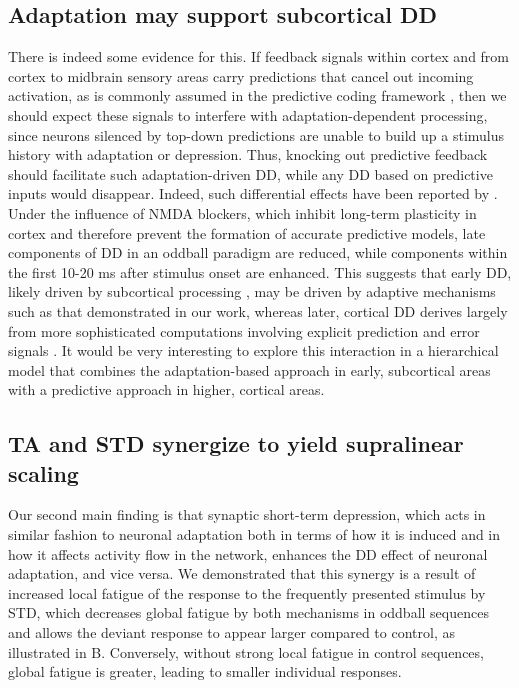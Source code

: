 \documentclass[9pt,lineno,onehalfspacing]{elife}
\begin{document}
\subsection{Adaptation may support subcortical DD}

There is indeed some evidence for this. If feedback signals within cortex and from cortex to midbrain sensory areas carry predictions that cancel out incoming activation, as is commonly assumed in the predictive coding framework \citep{Rao1999-xc, Friston2005-jz, Carbajal2018-sd}, then we should expect these signals to interfere with adaptation-dependent processing, since neurons silenced by top-down predictions are unable to build up a stimulus history with adaptation or depression. Thus, knocking out predictive feedback should facilitate such adaptation-driven DD, while any DD based on predictive inputs would disappear. Indeed, such differential effects have been reported by \cite{Harms2018-bg}. Under the influence of NMDA blockers, which inhibit long-term plasticity in cortex and therefore prevent the formation of accurate predictive models, late components of DD in an oddball paradigm are reduced, while components within the first 10-20 ms after stimulus onset are enhanced. This suggests that early DD, likely driven by subcortical processing \citep{Grimm2012-tb, Parras2017-fp, Font-Alaminos2020-fs}, may be driven by adaptive mechanisms such as that demonstrated in our work, whereas later, cortical DD derives largely from more sophisticated computations involving explicit prediction and error signals \citep{Schlossmacher2022-zv, Grimm2016-fr}. It would be very interesting to explore this interaction in a hierarchical model that combines the adaptation-based approach in early, subcortical areas with a predictive approach \citep{Wacongne2012-ah, Wacongne2016-ht, Hertag2020-kc} in higher, cortical areas. 

\subsection{TA and STD synergize to yield supralinear scaling}

Our second main finding is that synaptic short-term depression, which acts in similar fashion to neuronal adaptation both in terms of how it is induced and in how it affects activity flow in the network, enhances the DD effect of neuronal adaptation, and vice versa. We demonstrated that this synergy is a result of increased local fatigue of the response to the frequently presented stimulus by STD, which decreases global fatigue by both mechanisms in oddball sequences and allows the deviant response to appear larger compared to control, as illustrated in B. Conversely, without strong local fatigue in control sequences, global fatigue is greater, leading to smaller individual responses.
\end{document}

